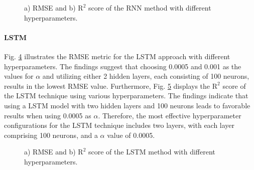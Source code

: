 \documentclass[conference]{IEEEtran}
\begin{document}
{\begin{appendices}
\begin{figure}[htbp]
    \centering
    \begin{subfigure}[b]{0.5\linewidth}
        \centering
        
        \caption{}
        \label{fig:rmse-rnn}
    \end{subfigure}%
    \begin{subfigure}[b]{0.5\linewidth}
        \centering
        
        \caption{}
        \label{fig:r2-rnn}
    \end{subfigure}
    \caption{a) RMSE and b) $\text{R}^2$ score of the RNN method with different hyperparameters.}
    \label{fig:rnn-hypers}
    \vspace{-4mm}
\end{figure}

\paragraph{LSTM}
Fig. \ref{fig:rmse-lstm} illustrates the RMSE metric for the LSTM approach with different hyperparameters. The findings suggest that choosing 0.0005 and 0.001 as the values for $\alpha$ and utilizing either 2 hidden layers, each consisting of 100 neurons, results in the lowest RMSE value. Furthermore, Fig. \ref{fig:r2-lstm} displays the $\text{R}^2$ score of the LSTM technique using various hyperparameters. The findings indicate that using a LSTM model with two hidden layers and 100 neurons leads to favorable results when using 0.0005 as $\alpha$. Therefore, the most effective hyperparameter configurations for the LSTM technique includes two layers, with each layer comprising 100 neurons, and a $\alpha$ value of 0.0005.

\begin{figure}[htbp]
    \centering
    \begin{subfigure}[b]{0.5\linewidth}
        \centering
        
        \caption{}
        \label{fig:rmse-lstm}
    \end{subfigure}%
    \begin{subfigure}[b]{0.5\linewidth}
        \centering
        
        \caption{}
        \label{fig:r2-lstm}
    \end{subfigure}
    \caption{a) RMSE and b) $\text{R}^2$ score of the LSTM method with different hyperparameters.}
    \label{fig:lstm-hypers}
    \vspace{-4mm}
\end{figure}


\end{appendices}}
\end{document}
